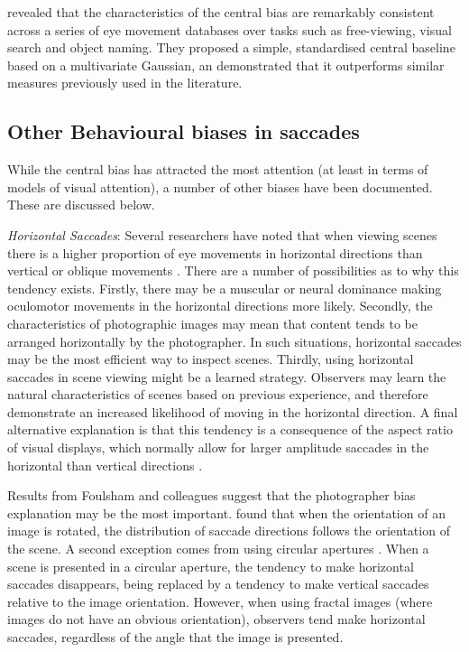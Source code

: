 \cite{clarke-tatler2014} revealed that the characteristics of the central bias are remarkably consistent across a series of eye movement databases over tasks such as free-viewing, visual search and object naming. They proposed a simple, standardised central baseline based on a multivariate Gaussian, an demonstrated that it outperforms similar measures previously used in the literature.

\subsection{Other Behavioural biases in saccades}
While the central bias has attracted the most attention (at least in terms of models of visual attention), a number of other biases have been documented. These are discussed below. 

\textit{Horizontal Saccades}: Several researchers have noted that when viewing scenes there is a higher proportion of eye movements in horizontal directions than vertical or oblique movements \citep[e.g.][]{gilchrist2006,foulsham2008,tatler-vincent2009,lappe1998,lee2002}. There are a number of possibilities as to why this tendency exists. Firstly, there may be a muscular or neural dominance making oculomotor movements in the horizontal directions more likely. Secondly, the characteristics of photographic images may mean that content tends to be arranged horizontally by the photographer. In such situations, horizontal saccades may be the most efficient way to inspect scenes. Thirdly, using horizontal saccades in scene viewing might be a learned strategy. Observers may learn the natural characteristics of scenes based on previous experience, and therefore demonstrate an increased likelihood of moving in the horizontal direction. A final alternative explanation is that this tendency is a consequence of the aspect ratio of visual displays, which normally allow for larger amplitude saccades in the horizontal than vertical directions \citep{wartburg2007}.

Results from Foulsham and colleagues suggest that the photographer bias explanation may be the most important. \cite{foulsham2008} found that when the orientation of an image is rotated, the distribution of saccade directions follows the orientation of the scene. A second exception comes from using circular apertures \citep{foulsham-kingstone2010}. When a scene is presented in a circular aperture, the tendency to make horizontal saccades disappears, being replaced by a tendency to make vertical saccades relative to the image orientation. However, when using fractal images (where images do not have an obvious orientation), observers tend make horizontal saccades, regardless of the angle that the image is presented.

